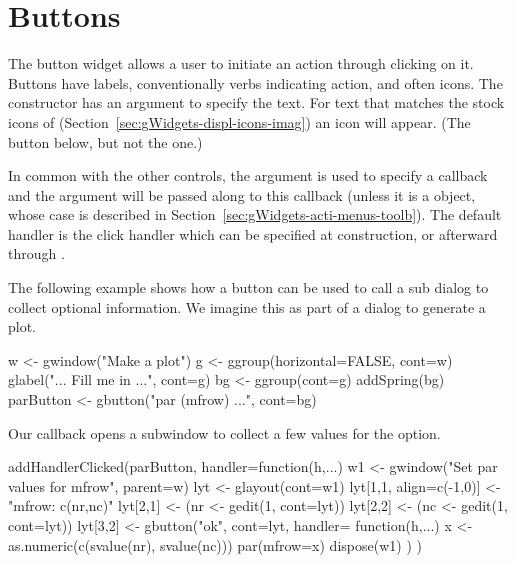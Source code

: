 
\section{Buttons}
\label{sec:gWidgets-buttons}

The button widget allows a user to initiate an action through clicking
on it. Buttons have labels, conventionally verbs indicating action,
and often icons. The  constructor has an argument
 to specify the text.  For text that matches
the stock icons of 
(Section~\ref{sec:gWidgets-displ-icons-imag}) an icon will
appear. (The  button below, but not the  one.)

In common with the other controls, the argument
 is used to specify a callback and the
 argument will be passed along to this
callback (unless it is a  object, whose case is
described in Section~\ref{sec:gWidgets-acti-menus-toolb}).  The
default handler is the click handler which can be specified at
construction, or afterward through
. 

The following example shows how a button can be used to call a sub
dialog to collect optional information. We imagine this as part of a
dialog to generate a plot.

\begin{Schunk}
\begin{Sinput}
 w <- gwindow("Make a plot")
 g <- ggroup(horizontal=FALSE, cont=w)
 glabel("... Fill me in ...", cont=g)
 bg <- ggroup(cont=g)
 addSpring(bg)
 parButton <- gbutton("par (mfrow) ...", cont=bg)
\end{Sinput}
\end{Schunk}
Our callback opens a subwindow to collect a few values for the
 option.
\begin{Schunk}
\begin{Sinput}
 addHandlerClicked(parButton, handler=function(h,...) {
   w1 <- gwindow("Set par values for mfrow", parent=w)
   lyt <- glayout(cont=w1)
   lyt[1,1, align=c(-1,0)] <- "mfrow: c(nr,nc)"
   lyt[2,1] <- (nr <- gedit(1, cont=lyt))
   lyt[2,2] <- (nc <- gedit(1, cont=lyt))
   lyt[3,2] <- gbutton("ok", cont=lyt, handler=
                 function(h,...) {
                   x <- as.numeric(c(svalue(nr), svalue(nc)))
                   par(mfrow=x)
                   dispose(w1)
                 })
 })
\end{Sinput}
\end{Schunk}



